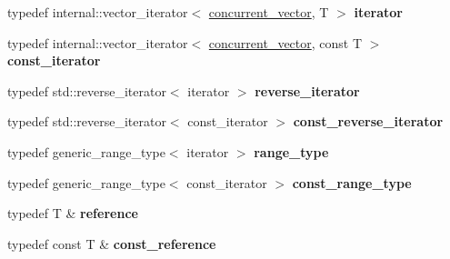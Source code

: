 \begin{DoxyCompactItemize}
\item 
\hypertarget{classtbb_1_1concurrent__vector_a1d8a0e7add13ae70d1f0193cd2c64b91}{}typedef internal\+::vector\+\_\+iterator$<$ \hyperlink{classtbb_1_1concurrent__vector}{concurrent\+\_\+vector}, T $>$ {\bfseries iterator}\label{classtbb_1_1concurrent__vector_a1d8a0e7add13ae70d1f0193cd2c64b91}

\item 
\hypertarget{classtbb_1_1concurrent__vector_ad0c6fa6c0bc90835d96de2aad2351ed6}{}typedef internal\+::vector\+\_\+iterator$<$ \hyperlink{classtbb_1_1concurrent__vector}{concurrent\+\_\+vector}, const T $>$ {\bfseries const\+\_\+iterator}\label{classtbb_1_1concurrent__vector_ad0c6fa6c0bc90835d96de2aad2351ed6}

\item 
\hypertarget{classtbb_1_1concurrent__vector_a3312c530fa816ebee6693b27ab4bc983}{}typedef std\+::reverse\+\_\+iterator$<$ iterator $>$ {\bfseries reverse\+\_\+iterator}\label{classtbb_1_1concurrent__vector_a3312c530fa816ebee6693b27ab4bc983}

\item 
\hypertarget{classtbb_1_1concurrent__vector_aff6be5a78f8959dc548fdc7b1876cbff}{}typedef std\+::reverse\+\_\+iterator$<$ const\+\_\+iterator $>$ {\bfseries const\+\_\+reverse\+\_\+iterator}\label{classtbb_1_1concurrent__vector_aff6be5a78f8959dc548fdc7b1876cbff}

\item 
\hypertarget{classtbb_1_1concurrent__vector_a7aedde01d4998b65c4fdb36ea4c9b9ce}{}typedef generic\+\_\+range\+\_\+type$<$ iterator $>$ {\bfseries range\+\_\+type}\label{classtbb_1_1concurrent__vector_a7aedde01d4998b65c4fdb36ea4c9b9ce}

\item 
\hypertarget{classtbb_1_1concurrent__vector_af2f8e0834cbaf80e43bad6be140a03c1}{}typedef generic\+\_\+range\+\_\+type$<$ const\+\_\+iterator $>$ {\bfseries const\+\_\+range\+\_\+type}\label{classtbb_1_1concurrent__vector_af2f8e0834cbaf80e43bad6be140a03c1}

\item 
\hypertarget{classtbb_1_1concurrent__vector_a8fa7c28f1260fe6726ec6c845754d429}{}typedef T \& {\bfseries reference}\label{classtbb_1_1concurrent__vector_a8fa7c28f1260fe6726ec6c845754d429}

\item 
\hypertarget{classtbb_1_1concurrent__vector_a32b8a750f2692c1fc5a3d9995400277b}{}typedef const T \& {\bfseries const\+\_\+reference}\label{classtbb_1_1concurrent__vector_a32b8a750f2692c1fc5a3d9995400277b}


\end{DoxyCompactItemize}
